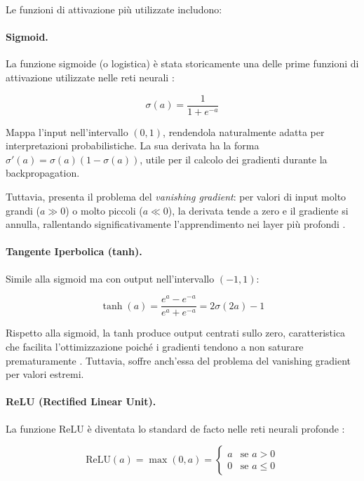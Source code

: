Le funzioni di attivazione più utilizzate includono:

\paragraph{Sigmoid.} La funzione sigmoide (o logistica) è stata storicamente una delle prime funzioni di attivazione utilizzate nelle reti neurali \cite{rumelhart1986learning}:

\begin{equation}
\sigma(a) = \frac{1}{1 + e^{-a}}
\end{equation}

Mappa l'input nell'intervallo $(0, 1)$, rendendola naturalmente adatta per interpretazioni probabilistiche. La sua derivata ha la forma $\sigma'(a) = \sigma(a)(1-\sigma(a))$, utile per il calcolo dei gradienti durante la backpropagation.

Tuttavia, presenta il problema del \textit{vanishing gradient}: per valori di input molto grandi ($a \gg 0$) o molto piccoli ($a \ll 0$), la derivata tende a zero e il gradiente si annulla, rallentando significativamente l'apprendimento nei layer più profondi \cite{hochreiter1991untersuchungen,bengio1994learning}.

\paragraph{Tangente Iperbolica (tanh).} Simile alla sigmoid ma con output nell'in\-ter\-val\-lo $(-1, 1)$:

\begin{equation}
\tanh(a) = \frac{e^{a} - e^{-a}}{e^{a} + e^{-a}} = 2\sigma(2a) - 1
\end{equation}

Rispetto alla sigmoid, la tanh produce output centrati sullo zero, caratteristica che facilita l'ottimizzazione poiché i gradienti tendono a non saturare prematuramente \cite{glorot2010understanding}. Tuttavia, soffre anch'essa del problema del vanishing gradient per valori estremi.

\paragraph{ReLU (Rectified Linear Unit).} La funzione ReLU è diventata lo standard de facto nelle reti neurali profonde \cite{nair2010rectified, glorot2011deep}:

\begin{equation}
\text{ReLU}(a) = \max(0, a) = \begin{cases}
a & \text{se } a > 0 \\
0 & \text{se } a \leq 0
\end{cases}
\end{equation}

